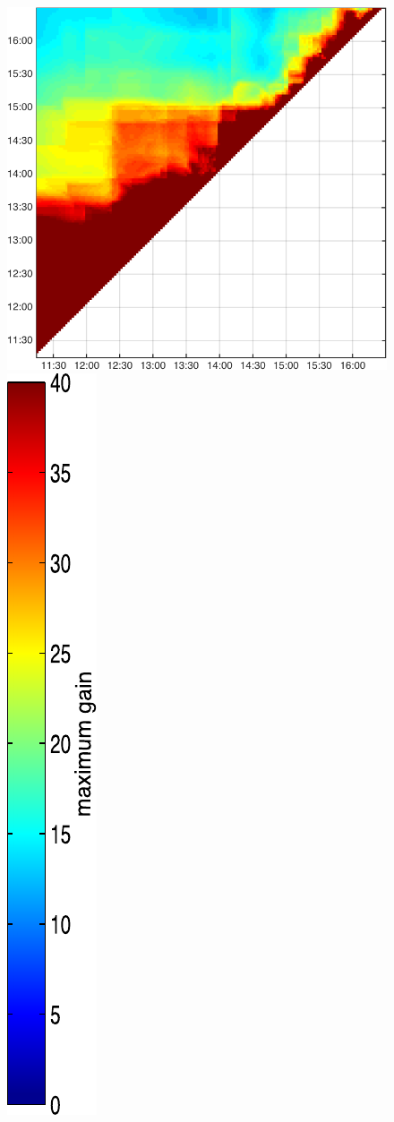 \begin{figure}
\begin{minipage}[c]{\mylength}
\includegraphics[valign=t,width=\eventswidth]{events/20130816-maxGain-local-events.png}
\includegraphics[valign=t,trim=2pt -8pt 0 5pt,width=\colorbarwidth,totalheight=\eventheight]{events/colorbar-40.pdf}

\end{minipage}
\end{figure}
